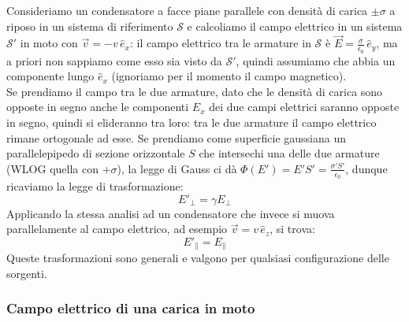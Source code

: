 \documentclass[]{article}
\begin{document}
Consideriamo un condensatore a facce piane parallele con densità di carica $ \pm\sigma $ a riposo in un sistema di riferimento $ \mathcal{S} $ e calcoliamo il campo elettrico in un sistema $ \mathcal{S}' $ in moto con $ \vec{v} = -v\,\hat{e}_x $: il campo elettrico tra le armature in $ \mathcal{S} $ è $ \vec{E} = \frac{\sigma}{\epsilon_0}\,\hat{e}_y $, ma a priori non sappiamo come esso sia visto da $ \mathcal{S}' $, quindi assumiamo che abbia un componente lungo $ \hat{e}_x $ (ignoriamo per il momento il campo magnetico). \\ 
%
Se prendiamo il campo tra le due armature, dato che le densità di carica sono opposte in segno anche le componenti $ E_x $ dei due campi elettrici saranno opposte in segno, quindi si elideranno tra loro: tra le due armature il campo elettrico rimane ortogonale ad esse.
Se prendiamo come superficie gaussiana un parallelepipedo di sezione orizzontale $ S $ che intersechi una delle due armature (WLOG quella con $ +\sigma $), la legge di Gauss ci dà $ \Phi(E') = E'S' = \frac{\sigma'S'}{\epsilon_0} $, dunque ricaviamo la legge di trasformazione:
\begin{equation}
	E'_{\perp} = \gamma E_{\perp}
	\label{eq:28}
\end{equation}
Applicando la stessa analisi ad un condensatore che invece si muova parallelamente al campo elettrico, ad esempio $ \vec{v} = v \,\hat{e}_z $, si trova:
\begin{equation}
	E'_{\parallel} = E_{\parallel}
	\label{eq:29}
\end{equation}
Queste trasformazioni sono generali e valgono per qualsiasi configurazione delle sorgenti.

\subsubsection{Campo elettrico di una carica in moto}
\end{document}
